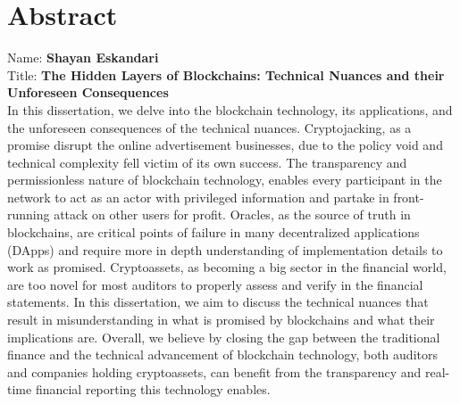 
\chapter*{Abstract}

Name: 	\tab \textbf{Shayan Eskandari} \\
Title: 	\tab \textbf{The Hidden Layers of Blockchains: Technical Nuances and their Unforeseen Consequences}\\



In this dissertation, we delve into the blockchain technology, its applications, and the unforeseen consequences of the technical nuances. Cryptojacking, as a promise disrupt the online advertisement businesses, due to the policy void and technical complexity fell victim of its own success. The transparency and permissionless nature of blockchain technology, enables every participant in the network to act as an actor with privileged information and partake in front-running attack on other users for profit. Oracles, as the source of truth in blockchains, are critical points of failure in many decentralized applications (DApps) and require more in depth understanding of implementation details to work as promised. Cryptoassets, as becoming a big sector in the financial world, are too novel for most auditors to properly assess and verify in the financial statements. In this dissertation, we aim to discuss the technical nuances that result in misunderstanding in what is promised by blockchains and what their implications are. Overall, we believe by closing the gap between the traditional finance and the technical advancement of blockchain technology, both auditors and companies holding cryptoassets, can benefit from the transparency and real-time financial reporting this technology enables. 



